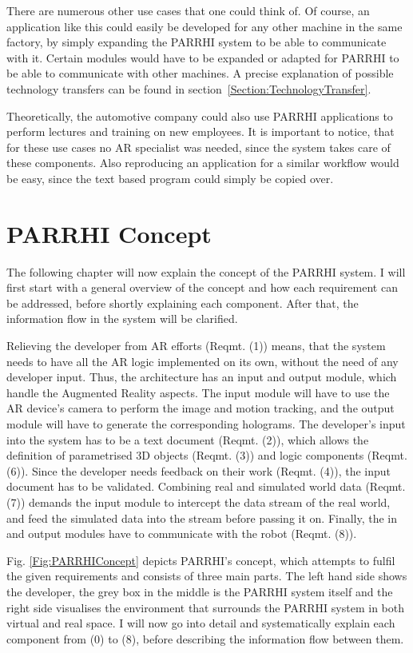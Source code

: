 There are numerous other use cases that one could think of. Of course, an application like this could easily be developed for any other machine in the same factory, by simply expanding the PARRHI system to be able to communicate with it. Certain modules would have to be expanded or adapted for PARRHI to be able to communicate with other machines. A precise explanation of possible technology transfers can be found in section~\ref{Section:TechnologyTransfer}.

Theoretically, the automotive company could also use PARRHI applications to perform lectures and training on new employees. It is important to notice, that for these use cases no AR specialist was needed, since the system takes care of these components. Also reproducing an application for a similar workflow would be easy, since the text based program could simply be copied over.

\section{PARRHI Concept}

The following chapter will now explain the concept of the PARRHI system. I will first start with a general overview of the concept and how each requirement can be addressed, before shortly explaining each component. After that, the information flow in the system will be clarified.

Relieving the developer from AR efforts (Reqmt. (1)) means, that the system needs to have all the AR logic implemented on its own, without the need of any developer input. Thus, the architecture has an input and output module, which handle the Augmented Reality aspects. The input module will have to use the AR device's camera to perform the image and motion tracking, and the output module will have to generate the corresponding holograms. The developer's input into the system has to be a text document (Reqmt. (2)), which allows the definition of parametrised 3D objects (Reqmt. (3)) and logic components (Reqmt. (6)). Since the developer needs feedback on their work (Reqmt. (4)), the input document has to be validated. Combining real and simulated world data (Reqmt. (7)) demands the input module to intercept the data stream of the real world, and feed the simulated data into the stream before passing it on. Finally, the in and output modules have to communicate with the robot (Reqmt. (8)).

Fig. \ref{Fig:PARRHIConcept} depicts PARRHI's concept, which attempts to fulfil the given requirements and consists of three main parts. The left hand side shows the developer, the grey box in the middle is the PARRHI system itself and the right side visualises the environment that surrounds the PARRHI system in both virtual and real space. I will now go into detail and systematically explain each component from (0) to (8), before describing the information flow between them.

